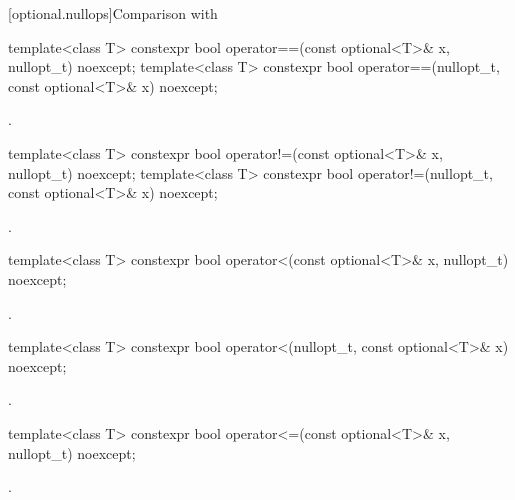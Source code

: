 [optional.nullops]{Comparison with }

%
\begin{itemdecl}
template<class T> constexpr bool operator==(const optional<T>& x, nullopt_t) noexcept;
template<class T> constexpr bool operator==(nullopt_t, const optional<T>& x) noexcept;
\end{itemdecl}

\begin{itemdescr}
\pnum
\returns
{}.
\end{itemdescr}

%
\begin{itemdecl}
template<class T> constexpr bool operator!=(const optional<T>& x, nullopt_t) noexcept;
template<class T> constexpr bool operator!=(nullopt_t, const optional<T>& x) noexcept;
\end{itemdecl}

\begin{itemdescr}
\pnum
\returns
{}.
\end{itemdescr}

%
\begin{itemdecl}
template<class T> constexpr bool operator<(const optional<T>& x, nullopt_t) noexcept;
\end{itemdecl}

\begin{itemdescr}
\pnum
\returns
{}.
\end{itemdescr}

%
\begin{itemdecl}
template<class T> constexpr bool operator<(nullopt_t, const optional<T>& x) noexcept;
\end{itemdecl}

\begin{itemdescr}
\pnum
\returns
{}.
\end{itemdescr}

%
\begin{itemdecl}
template<class T> constexpr bool operator<=(const optional<T>& x, nullopt_t) noexcept;
\end{itemdecl}

\begin{itemdescr}
\pnum
\returns
{}.
\end{itemdescr}

